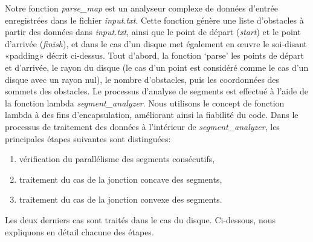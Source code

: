 \documentclass[12pt]{article}
\begin{document}
	Notre fonction \textit{parse\_map} est un analyseur complexe de données d'entrée enregistrées dans le fichier \textit{input.txt}. Cette fonction génère une liste d'obstacles à partir des données dans \textit{input.txt}, ainsi que le point de départ (\textit{start}) et le point d’arrivée (\textit{finish}), et dans le cas d'un disque met également en œuvre le soi-disant «padding» décrit ci-dessus. Tout d'abord, la fonction ‘parse’ les points de départ et d’arrivée, le rayon du disque (le cas d'un point est considéré comme le cas d'un disque avec un rayon nul), le nombre d'obstacles, puis les coordonnées des sommets des obstacles. Le processus d'analyse de segments est effectué à l'aide de la fonction lambda \textit{segment\_analyzer}. Nous utilisons le concept de fonction lambda à des fins d'encapsulation, améliorant ainsi la fiabilité du code. Dans le processus de traitement des données à l'intérieur de \textit{segment\_analyzer}, les principales étapes suivantes sont distinguées:
	
	\begin{enumerate}
		\item vérification du parallélisme des segments consécutifs, 
		\item traitement du cas de la jonction concave des segments,
		\item traitement du cas de la jonction convexe des segments.
	\end{enumerate} 
	
	Les deux derniers cas sont traités dans le cas du disque.
	Ci-dessous, nous expliquons en détail chacune des étapes.
	
\end{document}
